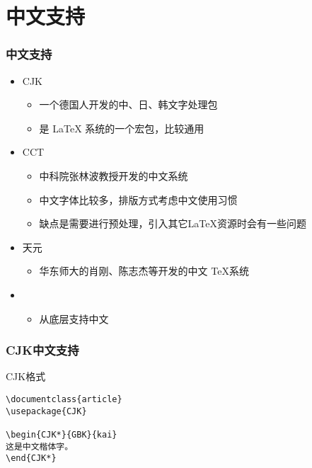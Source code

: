 \section{中文支持}
\begin{frame}\frametitle{中文支持}
    \begin{itemize}
        \item<1-> CJK
            \begin{itemize}
              \item<2-> 一个德国人开发的中、日、韩文字处理包
              \item<3-> 是 \LaTeX{} 系统的一个宏包，比较通用
            \end{itemize}
        \item<4-> CCT
            \begin{itemize}
              \item<5-> 中科院张林波教授开发的中文系统
              \item<6-> 中文字体比较多，排版方式考虑中文使用习惯
              \item<7-> 缺点是需要进行预处理，引入其它LaTeX资源时会有一些问题
            \end{itemize}
        \item<8-> 天元
            \begin{itemize}
              \item<9-> 华东师大的肖刚、陈志杰等开发的中文 \TeX{}系统
            \end{itemize}
        \item<10-> \XeLaTeX{}
            \begin{itemize}
              \item<11-> 从底层支持中文
            \end{itemize}
    \end{itemize}
\end{frame}

\begin{frame}[fragile]\frametitle{CJK中文支持}
\begin{block}{CJK格式}
    \begin{verbatim}
\documentclass{article}
\usepackage{CJK}

\begin{CJK*}{GBK}{kai}
这是中文楷体字。
\end{CJK*}

    \end{verbatim}
\end{block}
\end{frame}

